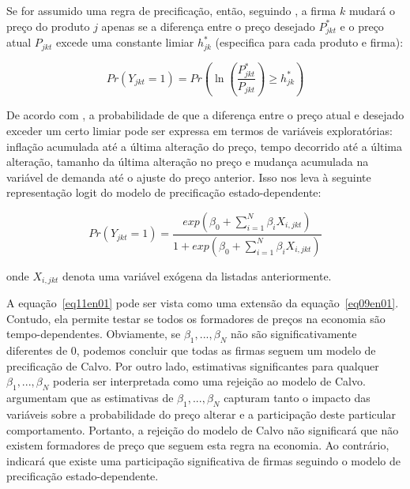 \documentclass[twoside,a4paper,11pt]{report}
\begin{document}
Se for assumido uma regra de precificação, então, seguindo \citet{cecchetti1986frequency}, a firma $k$ mudará o preço do produto $j$ apenas se a diferença entre o preço desejado $P_{jkt}^{*}$ e o preço atual $P_{jkt}$ excede uma constante limiar $h_{jk}^{*}$ (especifica para cada produto e firma):

\begin{equation}\label{eq10en01}
Pr\left( { Y }_{ jkt }=1 \right) =Pr\left( \ln { \left( \frac { { P }_{ jkt }^{ * } }{ { P }_{ jkt } }  \right) \ge { h }_{ jk }^{ * } }  \right) 
\end{equation}

De acordo com \citet{cecchetti1986frequency}, a probabilidade de que a diferença entre o preço atual e desejado exceder um certo limiar pode ser expressa em termos de variáveis exploratórias: inflação acumulada até a última alteração do preço, tempo decorrido até a última alteração, tamanho da última alteração no preço e mudança acumulada na variável de demanda até o ajuste do preço anterior. Isso nos leva à seguinte representação logit do modelo de precificação estado-dependente:

\begin{equation}\label{eq11en01}
Pr\left( { Y }_{ jkt }=1 \right) =\frac { exp\left( { \beta  }_{ 0 }+\sum _{ i=1 }^{ N }{ { \beta  }_{ i }{ X }_{ i,jkt } }  \right)  }{ 1+exp\left( { \beta  }_{ 0 }+\sum _{ i=1 }^{ N }{ { \beta  }_{ i }{ X }_{ i,jkt } }  \right)  } 
\end{equation}

\noindent onde ${ X }_{ i,jkt }$ denota uma variável exógena da listadas anteriormente.

A equação~\ref{eq11en01} pode ser vista como uma extensão da equação~\ref{eq09en01}. Contudo, ela permite testar se todos os formadores de preços na economia são tempo-dependentes. Obviamente, se $\beta_{1},...,\beta_{N}$ não são significativamente diferentes de 0, podemos concluir que todas as firmas seguem um modelo de precificação de Calvo. Por outro lado, estimativas significantes para qualquer $\beta_{1},...,\beta_{N}$ poderia ser interpretada como uma rejeição ao modelo de Calvo. \citet{aucremanne2005time} argumentam que as estimativas de $\beta_{1},...,\beta_{N}$ capturam tanto o impacto das variáveis sobre a probabilidade do preço alterar e a participação deste particular comportamento. Portanto, a rejeição do modelo de Calvo não significará que não existem formadores de preço que seguem esta regra na economia. Ao contrário, indicará que existe uma participação significativa de firmas seguindo o modelo de precificação estado-dependente.
\end{document}

